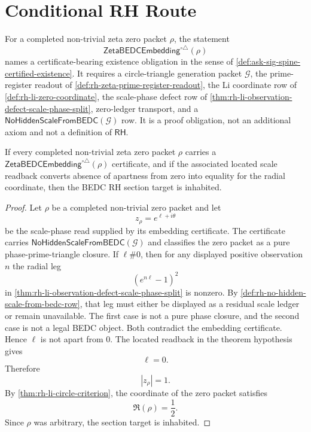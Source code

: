 \section{Conditional RH Route}
\label{sec:rh-circle-triangle-conditional-route}

\begin{definition}
\label{def:rh-zeta-bedc-circle-triangle-embedding}
For a completed non-trivial zeta zero packet $\rho$, the statement
$$
\mathsf{ZetaBEDCEmbedding}^{\circ\triangle}(\rho)
$$
names a certificate-bearing existence obligation in the sense of
\autoref{def:ask-sig-spine-certified-existence}. It requires a
circle-triangle generation packet $\mathcal G$, the prime-register
readout of \autoref{def:rh-zeta-prime-register-readout}, the Li
coordinate row of \autoref{def:rh-li-zero-coordinate}, the scale-phase
defect row of
\autoref{thm:rh-li-observation-defect-scale-phase-split}, zero-ledger
transport, and a
$\mathsf{NoHiddenScaleFromBEDC}(\mathcal G)$ row. It is a proof
obligation, not an additional axiom and not a definition of
$\mathsf{RH}$.
\end{definition}

\begin{theorem}
\label{thm:rh-circle-triangle-embedding-conditionally-sufficient}
If every completed non-trivial zeta zero packet $\rho$ carries a
$\mathsf{ZetaBEDCEmbedding}^{\circ\triangle}(\rho)$ certificate, and if
the associated located scale readback converts absence of apartness from
zero into equality for the radial coordinate, then the BEDC RH section
target is inhabited.
\end{theorem}

\begin{proof}
Let $\rho$ be a completed non-trivial zero packet and let
$$
z_{\rho}=e^{\ell+i\theta}
$$
be the scale-phase read supplied by its embedding certificate. The
certificate carries
$\mathsf{NoHiddenScaleFromBEDC}(\mathcal G)$ and classifies the zero
packet as a pure phase-prime-triangle closure. If $\ell\#0$, then for
any displayed positive observation $n$ the radial leg
$$
(e^{n\ell}-1)^2
$$
in \autoref{thm:rh-li-observation-defect-scale-phase-split} is nonzero.
By \autoref{def:rh-no-hidden-scale-from-bedc-row}, that leg must either
be displayed as a residual scale ledger or remain unavailable. The first
case is not a pure phase closure, and the second case is not a legal
BEDC object. Both contradict the embedding certificate. Hence $\ell$ is
not apart from $0$. The located readback in the theorem hypothesis gives
$$
\ell=0.
$$
Therefore
$$
|z_{\rho}|=1.
$$
By \autoref{thm:rh-li-circle-criterion}, the coordinate of the zero
packet satisfies
$$
\Re(\rho)=\frac12.
$$
Since $\rho$ was arbitrary, the section target is inhabited.
\end{proof}

